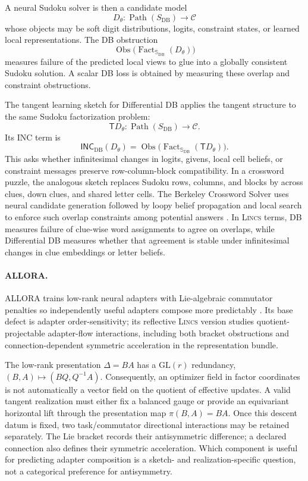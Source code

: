 \documentclass{article}
\newcommand{\C}{\mathcal{C}}
\newcommand{\T}{\mathsf{T}}
\newcommand{\INC}{\mathsf{INC}}
\newcommand{\Fact}{\operatorname{Fact}}
\newcommand{\Path}{\operatorname{Path}}
\newcommand{\Obs}{\operatorname{Obs}}
\begin{document}
A neural Sudoku solver is then a candidate model
\[
D_\theta:\Path(S_{\mathrm{DB}})\to\C
\]
whose objects may be soft digit distributions, logits, constraint states, or learned local representations. The DB obstruction
\[
\Obs\big(\Fact_{\mathbb S_{\mathrm{DB}}}(D_\theta)\big)
\]
measures failure of the predicted local views to glue into a globally consistent Sudoku solution. A scalar DB loss is obtained by measuring these overlap and constraint obstructions.

The tangent learning sketch for Differential DB applies the tangent structure to the same Sudoku factorization problem:
\[
\T D_\theta:\Path(S_{\mathrm{DB}})\to\C.
\]
Its INC term is
\[
\INC_{\mathrm{DB}}(D_\theta)
  =
  \Obs\big(\Fact_{\mathbb S_{\mathrm{DB}}}(\T D_\theta)\big).
\]
This asks whether infinitesimal changes in logits, givens, local cell beliefs, or constraint messages preserve row-column-block compatibility. In a crossword puzzle, the analogous sketch replaces Sudoku rows, columns, and blocks by across clues, down clues, and shared letter cells. The Berkeley Crossword Solver uses neural candidate generation followed by loopy belief propagation and local search to enforce such overlap constraints among potential answers \citep{wallace2022automated}. In \textsc{Lincs}   terms, DB measures failure of clue-wise word assignments to agree on overlaps, while Differential DB measures whether that agreement is stable under infinitesimal changes in clue embeddings or letter beliefs.

\paragraph{ALLORA.}
ALLORA trains low-rank neural adapters with Lie-algebraic commutator penalties so independently useful adapters compose more predictably \citep{mahadevan2026allora}. Its base defect is adapter order-sensitivity; its reflective \textsc{Lincs} version studies quotient-projectable adapter-flow interactions, including both bracket obstructions and connection-dependent symmetric acceleration in the representation bundle.

The low-rank presentation $\Delta=BA$ has a $\mathrm{GL}(r)$ redundancy,
$(B,A)\mapsto(BQ,Q^{-1}A)$.  Consequently, an optimizer field in factor
coordinates is not automatically a vector field on the quotient of effective
updates.  A valid tangent realization must either fix a balanced gauge or
provide an equivariant horizontal lift through the presentation map
$\pi(B,A)=BA$.  Once this descent datum is fixed, two task/commutator
directional interactions may be retained separately.  The Lie bracket records
their antisymmetric difference; a declared connection also defines their
symmetric acceleration.  Which component is useful for predicting adapter
composition is a sketch- and realization-specific question, not a categorical
preference for antisymmetry.
\end{document}
